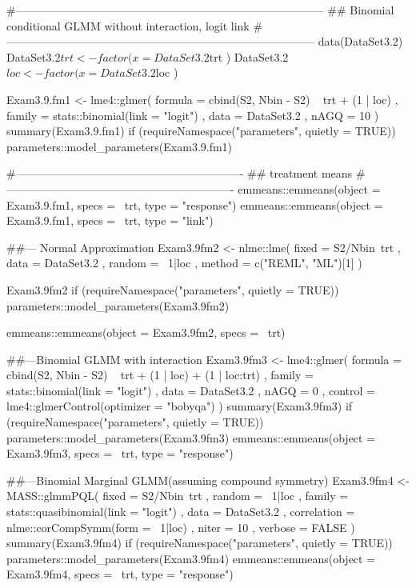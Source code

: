 \documentclass[a4paper]{book}
\begin{document}
\begin{Examples}
\begin{ExampleCode}
#-----------------------------------------------------------------------------------
## Binomial conditional GLMM without interaction, logit link
#-----------------------------------------------------------------------------------
data(DataSet3.2)
DataSet3.2$trt <- factor( x  =  DataSet3.2$trt )
DataSet3.2$loc <- factor( x  =  DataSet3.2$loc )

Exam3.9.fm1   <-
  lme4::glmer(
      formula = cbind(S2, Nbin - S2) ~ trt + (1 | loc)
    , family  = stats::binomial(link = "logit")
    , data    = DataSet3.2
    , nAGQ    = 10
  )
summary(Exam3.9.fm1)
if (requireNamespace("parameters", quietly = TRUE)) {
  parameters::model_parameters(Exam3.9.fm1)
}

#-------------------------------------------------------------
##  treatment means
#-------------------------------------------------------------
emmeans::emmeans(object = Exam3.9.fm1, specs = ~trt, type = "response")
emmeans::emmeans(object = Exam3.9.fm1, specs = ~trt, type = "link")

##--- Normal Approximation
Exam3.9fm2 <-
  nlme::lme(
      fixed       = S2/Nbin~trt
    , data        = DataSet3.2
    , random      = ~1|loc
    , method      = c("REML", "ML")[1]
  )

Exam3.9fm2
if (requireNamespace("parameters", quietly = TRUE)) {
  parameters::model_parameters(Exam3.9fm2)
}

emmeans::emmeans(object  = Exam3.9fm2, specs = ~trt)


##---Binomial GLMM with interaction
Exam3.9fm3   <-
  lme4::glmer(
      formula = cbind(S2, Nbin - S2) ~ trt + (1 | loc) + (1 | loc:trt)
    , family  = stats::binomial(link = "logit")
    , data    = DataSet3.2
    , nAGQ    = 0
    , control = lme4::glmerControl(optimizer = "bobyqa")
  )
summary(Exam3.9fm3)
if (requireNamespace("parameters", quietly = TRUE)) {
  parameters::model_parameters(Exam3.9fm3)
}
emmeans::emmeans(object = Exam3.9fm3, specs = ~trt, type = "response")


##---Binomial Marginal GLMM(assuming compound symmetry)
Exam3.9fm4   <-
  MASS::glmmPQL(
      fixed       =  S2/Nbin~trt
    , random      = ~1|loc
    , family      =  stats::quasibinomial(link = "logit")
    , data        =  DataSet3.2
    , correlation =  nlme::corCompSymm(form = ~1|loc)
    , niter       = 10
    , verbose     = FALSE
  )
summary(Exam3.9fm4)
if (requireNamespace("parameters", quietly = TRUE)) {
  parameters::model_parameters(Exam3.9fm4)
}
emmeans::emmeans(object  = Exam3.9fm4, specs  = ~trt, type = "response")

\end{ExampleCode}
\end{Examples}
\end{document}
